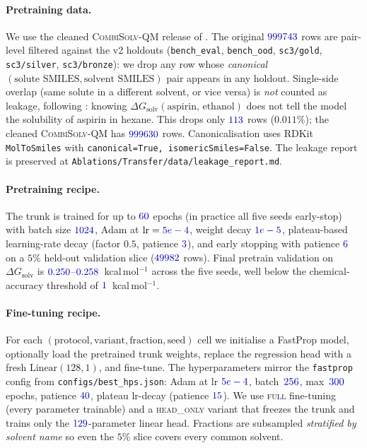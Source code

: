 \paragraph{Pretraining data.}  We use the cleaned
\textsc{CombiSolv-QM} release of
\citet{vermeire2021transfer}.  The original $\numval{999743}$ rows
are pair-level filtered against the \scthree{} v2 holdouts
(\texttt{bench\_eval}, \texttt{bench\_ood}, \texttt{sc3/gold},
\texttt{sc3/silver}, \texttt{sc3/bronze}): we drop any row whose
\emph{canonical} $({\text{solute SMILES}}, {\text{solvent SMILES}})$
pair appears in any holdout.  Single-side overlap (same solute in a
different solvent, or vice versa) is \emph{not} counted as leakage,
following \citet{vermeire2021transfer}: knowing
$\Delta G_{\text{solv}}(\text{aspirin, ethanol})$ does not tell the
model the solubility of aspirin in hexane.  This drops only
$\numval{113}$ rows ($0.011$\%); the cleaned
\textsc{CombiSolv-QM} has $\numval{999630}$ rows.  Canonicalisation
uses RDKit \texttt{MolToSmiles} with
\texttt{canonical=True, isomericSmiles=False}.  The leakage report
is preserved at \texttt{Ablations/Transfer/data/leakage\_report.md}.

\paragraph{Pretraining recipe.}  The trunk is trained for up to
$\numval{60}$ epochs (in practice all five seeds early-stop) with
batch size $\numval{1024}$, Adam at $\text{lr}=\numval{5e-4}$,
weight decay $\numval{1e-5}$, plateau-based learning-rate decay
(factor $0.5$, patience $\numval{3}$), and early stopping with
patience $\numval{6}$ on a $5$\% held-out validation slice
($\numval{49982}$ rows).  Final pretrain validation
\RMSE{} on $\Delta G_{\text{solv}}$ is
$\numval{0.250}$--$\numval{0.258}$~kcal\,mol$^{-1}$ across the five
seeds, well below the chemical-accuracy threshold of
$\numval{1}$~kcal\,mol$^{-1}$.

\paragraph{Fine-tuning recipe.}  For each
$(\text{protocol}, \text{variant}, \text{fraction}, \text{seed})$
cell we initialise a FastProp model, optionally load the pretrained
trunk weights, replace the regression head with a fresh
$\text{Linear}(128, 1)$, and fine-tune.  The hyperparameters mirror
the \texttt{fastprop} config from
\texttt{configs/best\_hps.json}: Adam at lr $\numval{5e-4}$,
batch~$\numval{256}$, max~$\numval{300}$ epochs, patience
$\numval{40}$, plateau lr-decay (patience $\numval{15}$).  We use
\textsc{full} fine-tuning (every parameter trainable) and a
\textsc{head\_only} variant that freezes the trunk and trains only
the $\numval{129}$-parameter linear head.  Fractions are subsampled
\emph{stratified by solvent name} so even the $5$\% slice covers
every common solvent.

